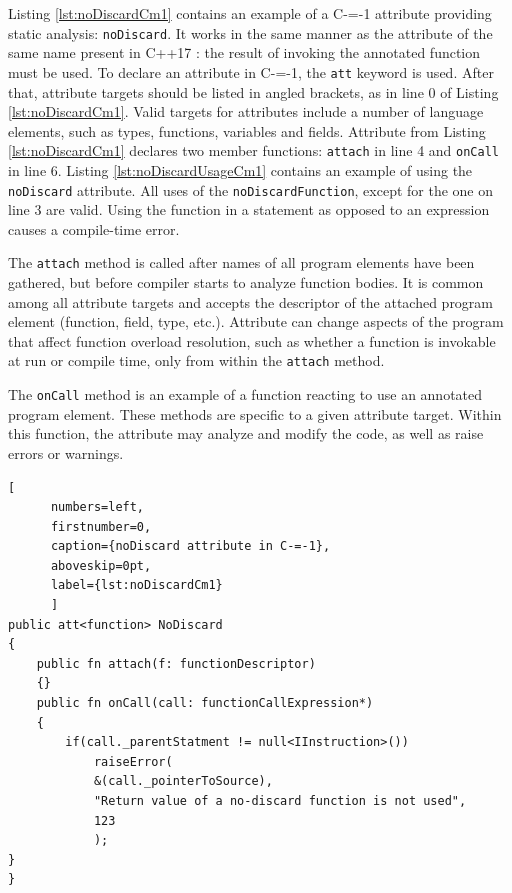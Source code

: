 Listing \ref{lst:noDiscardCm1} contains an example of a C-=-1 attribute providing static analysis: \lstinline{noDiscard}.
It works in the same manner as the attribute of the same name present in C++17 \cite{ISO:cpp17}: the result of invoking the annotated function must be used.
To declare an attribute in C-=-1, the \lstinline{att} keyword is used.
After that, attribute targets should be listed in angled brackets, as in line 0 of Listing \ref{lst:noDiscardCm1}.
Valid targets for attributes include a number of language elements, such as types, functions, variables and fields. Attribute from Listing \ref{lst:noDiscardCm1} declares two member functions: \lstinline{attach} in line 4 and \lstinline{onCall} in line 6.
Listing \ref{lst:noDiscardUsageCm1} contains an example of using the \lstinline{noDiscard} attribute.
All uses of the \lstinline|noDiscardFunction|, except for the one on line 3 are valid.
Using the function in a statement as opposed to an expression causes a compile-time error.

The \lstinline{attach} method is called after names of all program elements have been gathered, but before compiler starts to analyze function bodies.
It is common among all attribute targets and accepts the descriptor of the attached program element (function, field, type, etc.).
Attribute can change aspects of the program that affect function overload resolution, such as  whether a function is invokable at run or compile time, only from within the \lstinline{attach} method.

The \lstinline{onCall} method is an example of a function reacting to use an annotated program element.
These methods are specific to a given attribute target.
Within this function, the attribute may analyze and modify the code, as well as raise errors or warnings.

\begin{minipage}{\linewidth}

	\begin{lstlisting}[
	  numbers=left,
	  firstnumber=0,
	  caption={noDiscard attribute in C-=-1},
	  aboveskip=0pt,
	  label={lst:noDiscardCm1}
	  ]
public att<function> NoDiscard
{
	public fn attach(f: functionDescriptor)
	{}
	public fn onCall(call: functionCallExpression*)
	{
		if(call._parentStatment != null<IInstruction>())
			raiseError(
			&(call._pointerToSource),
			"Return value of a no-discard function is not used",
			123
			);
}
}
  \end{lstlisting}
\end{minipage}



